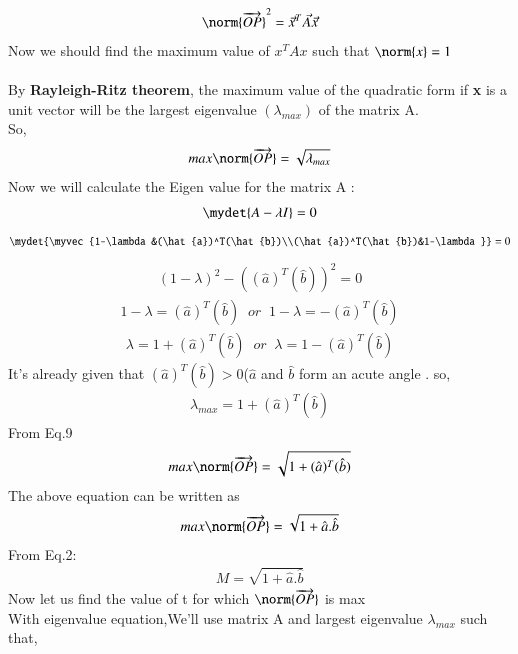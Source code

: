 \documentclass[journal]{IEEEtran}
\theoremstyle{remark}
\begin{document}
\begin{align}
\norm{\overrightarrow{OP}}^2=\Vec{x}^T\vec{A}\Vec{x}
  \end{align}
Now we should find the maximum value of \textbf{$x^TAx$} such that $\norm{x}=1$\\\\
By \textbf{Rayleigh-Ritz theorem}, the maximum value of the quadratic form if \textbf{x} is a unit vector will be the largest eigenvalue $(\lambda_{max})$ of the matrix A.\\
So,
\begin{align}
    max\norm{\overrightarrow{OP}}=\sqrt{\lambda_{max}}
\end{align}
Now we will calculate the Eigen value for the matrix A :
\begin{align}
    \mydet{A-\lambda I}=0
\end{align}
\begin{align}
    \mydet{\myvec{1-\lambda&(\hat{a})^T(\hat{b})\\(\hat{a})^T(\hat{b})&1-\lambda}}=0
\end{align}
\begin{align}
    (1-\lambda)^2-((\hat{a})^T(\hat{b}))^2=0
\end{align}
\begin{align}
    1-\lambda=(\hat{a})^T(\hat{b})\;\;or\;\;1-\lambda=-(\hat{a})^T(\hat{b})
\end{align}
\begin{align}
    \lambda=1+(\hat{a})^T(\hat{b})\;\;or \;\;\lambda=1-(\hat{a})^T(\hat{b})
\end{align}
It's already given that $(\hat{a})^T(\hat{b})>0 $($\hat{a}$ and $\hat{b}$ form an acute angle . so,
\begin{align}
 \lambda_{max}=1+  (\hat{a})^T(\hat{b}) 
\end{align}
From Eq.9
\begin{align}
    max\norm{\overrightarrow{OP}}=\sqrt{1+  (\hat{a})^T(\hat{b}) }
\end{align}
The above equation can be written as
\begin{align}
   max \norm{\overrightarrow{OP}}=\sqrt{1+\hat{a}.\hat{b}}
\end{align}
From Eq.2:
\begin{align}
    M=\sqrt{1+\hat{a}.\hat{b}}
\end{align}
Now let us find the value of t for which $\norm{\overrightarrow{OP}}$ is max\\
With eigenvalue equation,We'll use matrix A and largest eigenvalue $\lambda_{max}$ such that,
\end{document}
